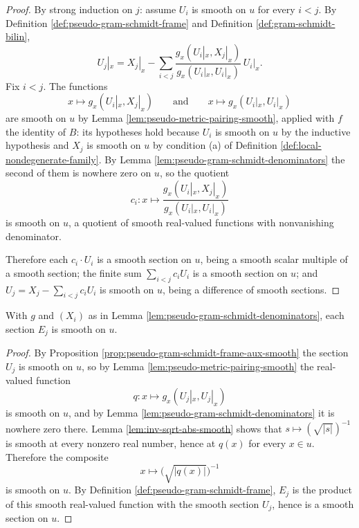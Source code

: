 \begin{proof}
\leanok
{}
By strong induction on $j$: assume $U_i$ is smooth on $u$ for every $i < j$. By Definition \ref{def:pseudo-gram-schmidt-frame} and Definition \ref{def:gram-schmidt-bilin},
\[
U_j|_x = X_j|_x - \sum_{i<j} \frac{g_x(U_i|_x, X_j|_x)}{g_x(U_i|_x, U_i|_x)} \, U_i|_x .
\]
Fix $i < j$. The functions
\[
x \mapsto g_x(U_i|_x, X_j|_x) \qquad\text{and}\qquad x \mapsto g_x(U_i|_x, U_i|_x)
\]
are smooth on $u$ by Lemma \ref{lem:pseudo-metric-pairing-smooth}, applied with $f$ the identity of $B$: its hypotheses hold because $U_i$ is smooth on $u$ by the inductive hypothesis and $X_j$ is smooth on $u$ by condition (a) of Definition \ref{def:local-nondegenerate-family}. By Lemma \ref{lem:pseudo-gram-schmidt-denominators} the second of them is nowhere zero on $u$, so the quotient
\[
c_i : x \mapsto \frac{g_x(U_i|_x, X_j|_x)}{g_x(U_i|_x, U_i|_x)}
\]
is smooth on $u$, a quotient of smooth real-valued functions with nonvanishing denominator.

Therefore each $c_i \cdot U_i$ is a smooth section on $u$, being a smooth scalar multiple of a smooth section; the finite sum $\sum_{i<j} c_i U_i$ is a smooth section on $u$; and $U_j = X_j - \sum_{i<j} c_i U_i$ is smooth on $u$, being a difference of smooth sections.
\end{proof}

\begin{proposition}
\label{prop:pseudo-gram-schmidt-frame-smooth}
\leanok
{}
With $g$ and $(X_i)$ as in Lemma \ref{lem:pseudo-gram-schmidt-denominators}, each section $E_j$ is smooth on $u$.
\end{proposition}

\begin{proof}
\leanok
{}
By Proposition \ref{prop:pseudo-gram-schmidt-frame-aux-smooth} the section $U_j$ is smooth on $u$, so by Lemma \ref{lem:pseudo-metric-pairing-smooth} the real-valued function
\[
q : x \mapsto g_x(U_j|_x, U_j|_x)
\]
is smooth on $u$, and by Lemma \ref{lem:pseudo-gram-schmidt-denominators} it is nowhere zero there. Lemma \ref{lem:inv-sqrt-abs-smooth} shows that $s \mapsto (\sqrt{|s|})^{-1}$ is smooth at every nonzero real number, hence at $q(x)$ for every $x \in u$. Therefore the composite
\[
x \mapsto \bigl(\sqrt{|q(x)|}\bigr)^{-1}
\]
is smooth on $u$. By Definition \ref{def:pseudo-gram-schmidt-frame}, $E_j$ is the product of this smooth real-valued function with the smooth section $U_j$, hence is a smooth section on $u$.
\end{proof}

